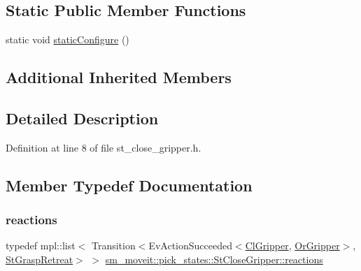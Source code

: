 \subsection*{Static Public Member Functions}
\begin{DoxyCompactItemize}
\item 
static void \hyperlink{structsm__moveit_1_1pick__states_1_1StCloseGripper_a1eb83e8ead707d9b9b92255070ea2fe5}{static\+Configure} ()
\end{DoxyCompactItemize}
\subsection*{Additional Inherited Members}


\subsection{Detailed Description}


Definition at line 8 of file st\+\_\+close\+\_\+gripper.\+h.



\subsection{Member Typedef Documentation}
\mbox{\label{structsm__moveit_1_1pick__states_1_1StCloseGripper_a2633bb75744ad12db32d6e874d7152fd}} 
\subsubsection{\texorpdfstring{reactions}{reactions}}
{\footnotesize\ttfamily typedef mpl\+::list$<$ Transition$<$Ev\+Action\+Succeeded$<$\hyperlink{classsm__moveit_1_1cl__gripper_1_1ClGripper}{Cl\+Gripper}, \hyperlink{classsm__moveit_1_1OrGripper}{Or\+Gripper}$>$, \hyperlink{structsm__moveit_1_1pick__states_1_1StGraspRetreat}{St\+Grasp\+Retreat}$>$ $>$ \hyperlink{structsm__moveit_1_1pick__states_1_1StCloseGripper_a2633bb75744ad12db32d6e874d7152fd}{sm\+\_\+moveit\+::pick\+\_\+states\+::\+St\+Close\+Gripper\+::reactions}}




